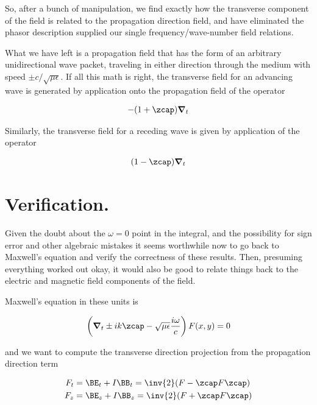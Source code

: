 So, after a bunch of manipulation, we find exactly how the transverse component of the field is related to the propagation direction field, and have eliminated the phasor description supplied our single frequency/wave-number field relations.

What we have left is a propagation field that has the form of an arbitrary unidirectional wave packet, traveling in either direction through the medium with speed $\pm c/\sqrt{\mu\epsilon}$.  If all this math is right, the transverse field for an advancing wave is generated by application onto the propagation field of the operator

\begin{align}\label{eqn:fooX}
-(1 + \zcap) \spacegrad_t
\end{align}

Similarly, the transverse field for a receding wave is given by application of the operator

\begin{align}\label{eqn:fooY}
(1 - \zcap) \spacegrad_t
\end{align}

\section{Verification.}

Given the doubt about the $\omega =0$ point in the integral, and the possibility for sign error and other algebraic mistakes it seems worthwhile now to go back to Maxwell's equation and verify the correctness of these results.  Then, presuming everything worked out okay, it would also be good to relate things back to the electric and magnetic field components of the field.

Maxwell's equation in these units is

\begin{align}\label{eqn:waveguideRetardedAdvanced:summaryMax2}
\left(\spacegrad_t \pm i k \zcap - \sqrt{\mu\epsilon}\frac{i\omega}{c}\right) F(x,y) = 0
\end{align}

and we want to compute the transverse direction projection from the propagation direction term

\begin{align}\label{eqn:waveguideRetardedAdvanced:foo5}
F_t &= \BE_t + I \BB_t = \inv{2} (F - \zcap F \zcap) \\
F_z &= \BE_z + I \BB_z = \inv{2} (F + \zcap F \zcap) 
\end{align}

